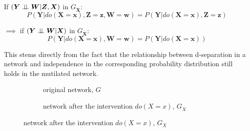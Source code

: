 \documentclass[11pt,a4paper,oneside]{book}
\theoremstyle{plain}
\theoremstyle{definition}
\begin{document}
If $(\boldsymbol{Y} \perp\!\!\!\perp \boldsymbol{W} | \boldsymbol{Z},\boldsymbol{X})$ in $G_{\overline{\boldsymbol{X}}}$:
\begin{equation}
\label{eq:Do1}
 P(\boldsymbol{Y}|do(\boldsymbol{X}=\boldsymbol{x}),\boldsymbol{Z}=\boldsymbol{z},\boldsymbol{W}=\boldsymbol{w}) = P(\boldsymbol{Y}|do(\boldsymbol{X}=\boldsymbol{x}),\boldsymbol{Z}=\boldsymbol{z}) 
\end{equation}

$\implies$ if $(\boldsymbol{Y} \perp\!\!\!\perp \boldsymbol{W} | \boldsymbol{X})$ in $G_{\overline{\boldsymbol{X}}}$:
\begin{equation}
\label{eq:Do12}
 P(\boldsymbol{Y}|do(\boldsymbol{X}=\boldsymbol{x}),\boldsymbol{W}=\boldsymbol{w}) = P(\boldsymbol{Y}|do(\boldsymbol{X}=\boldsymbol{x})) 
\end{equation}

This stems directly from the fact that the relationship between d-separation in a network and independence in the corresponding probability distribution still holds in the mutilated network. 

\begin{figure}[h]
\centering
\caption{Intervention in a causal bayesian network}
\label{fig:mutilatednet}
\begin{subfigure}[t]{0.3\textwidth}
\centering
\caption{original network, $G$}
\label{fig:mutilatedOriginal}
\end{subfigure}
\begin{subfigure}[t]{0.5\textwidth}
\centering
\caption{network after the intervention $do(X=x)$, $G_{\overline{X}}$}
\label{fig:mutilatedAfter}
\end{subfigure}
\end{figure}
\end{document}
